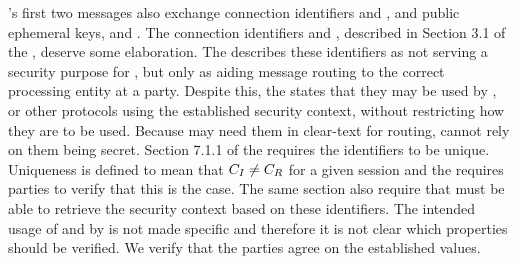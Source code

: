


%
%
%

\mEdhoc{}'s first two messages also exchange connection identifiers \mCi{} and
\mCr{}, and public ephemeral keys, \mGx{} and \mGy{}.
%
The connection identifiers \mCi{} and \mCr{}, described in Section 3.1 of the
\mSpec{}, deserve some elaboration.
%
The \mSpec{} describes these identifiers as not serving a security purpose for
\mEdhoc{}, but only as aiding message routing to the correct \mEdhoc{} processing
entity at a party.
%
Despite this, the \mSpec{} states that they may be used by \mOscore{}, or other
protocols using the established security context, without restricting how they
are to be used.
%
Because \mEdhoc{} may need them in clear-text for routing, \mOscore{} cannot
rely on them being secret.
%
Section 7.1.1 of the \mSpec{} requires the identifiers to be unique.
%
Uniqueness is defined to mean that $C_I{} \not = C_R{}$ for a given session
and the \mSpec{} requires parties to verify that this is the case.
%
The same section also require that \mOscore{} must be able to retrieve the
security context based on these identifiers.
%
The intended usage of \mCi{} and \mCr{} by \mOscore{} is not made specific and
therefore it is not clear which properties should be verified.
%
We verify that the parties agree on the established values.
%

